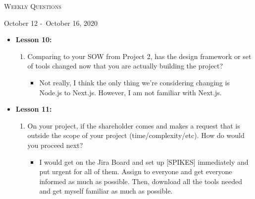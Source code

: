 \centerline{\LARGE\textsc{Weekly Questions}}
\centerline{October 12 -\ October 16, 2020}
\textbf{}
\begin{itemize}
  \item[] \textbf{\large Lesson 10:}
  \begin{enumerate}
    \item Comparing to your SOW from Project 2, has the design framework or set of tools changed now that you are actually building the project?
    \begin{itemize}
      \item Not really, I think the only thing we're considering changing is Node.js to Next.js. However, I am not familiar with Next.js.
    \end{itemize}
  \end{enumerate} 
\end{itemize}
\begin{itemize}
  \item[] \textbf{\large Lesson 11:}
  \begin{enumerate}
    \item On your project, if the shareholder comes and makes a request that is outside the scope of your project (time/complexity/etc). How do would you proceed next?
    \begin{itemize}
      \item I would get on the Jira Board and set up [SPIKES] immediately and put urgent for all of them. Assign to everyone and get everyone informed as much as possible.
      Then, download all the tools needed and get myself familiar as much as possible.  
    \end{itemize}
  \end{enumerate} 
\end{itemize}
